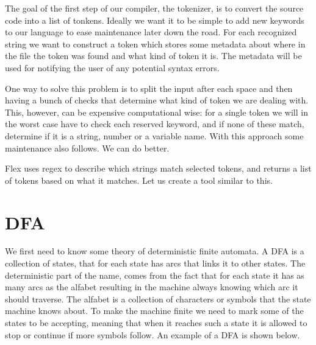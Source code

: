 The goal of the first step of our compiler, the tokenizer, is to convert the source code into a list of tonkens. Ideally we want it to be simple to add new keywords to our language to ease maintenance later down the road. For each recognized string we want to construct a token which stores some metadata about where in the file the token was found and what kind of token it is. The metadata will be used for notifying the user of any potential syntax errors.

One way to solve this problem is to split the input after each space and then having a bunch of checks that determine what kind of token we are dealing with. This, however, can be expensive computational wise: for a single token we will in the worst case have to check each reserved keyword, and if none of these match, determine if it is a string, number or a variable name. With this approach some maintenance also follows. We can do better. 

Flex uses regex to describe which strings match selected tokens, and returns a list of tokens based on what it matches. Let us create a tool similar to this.

\section{DFA}
We first need to know some theory of deterministic finite automata. A DFA is a collection of states, that for each state has arcs that links it to other states. The deterministic part of the name, comes from the fact that for each state it has as many arcs as the alfabet resulting in the machine always knowing which arc it should traverse. The alfabet is a collection of characters or symbols that the state machine knows about. To make the machine finite we need to mark some of the states to be accepting, meaning that when it reaches such a state it is allowed to stop or continue if more symbols follow. An example of a DFA is shown below.

\begin{center}
\end{center}

